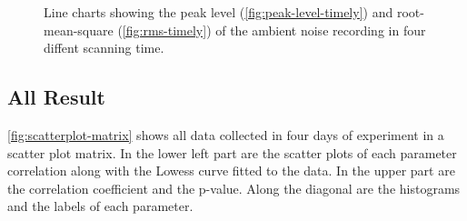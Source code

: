 {	\begin{figure}[h]
		\begin{adjustwidth}{-1cm}{}
		\caption{Line charts showing the peak level (\ref{fig:peak-level-timely}) and root-mean-square (\ref{fig:rms-timely}) of the ambient noise recording in four diffent scanning time.}
		\label{fig:audio-result-timely}
		\end{adjustwidth}
	\end{figure}
	}



	\subsection{All Result} %
	\label{sub:all_result}
	\autoref{fig:scatterplot-matrix} shows all data collected in four days of experiment in a scatter plot matrix. In the lower left part are the scatter plots of each parameter correlation along with the Lowess curve fitted to the data. In the upper part are the correlation coefficient and the p-value. Along the diagonal are the histograms and the labels of each parameter.

